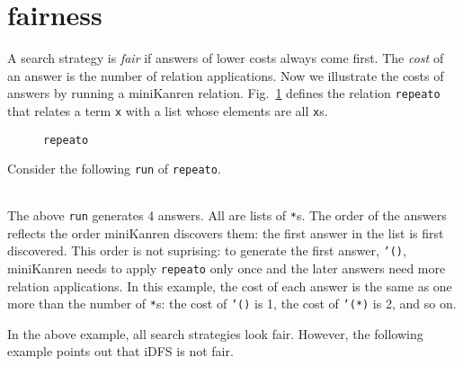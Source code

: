 \documentclass[format=acmlarge, review=true, authordraft=true]{acmart}
\begin{document}
\section{fairness}

A search strategy is \emph{fair} if answers of lower costs always come first. 
The \emph{cost} of an answer is the number of relation applications. Now we 
illustrate the costs of answers by running a miniKanren relation. 
Fig.~\ref{def-repeato} defines the relation \texttt{repeato} that relates a term 
\texttt{x} with a list whose elements are all \texttt{x}s.


\begin{figure}
  
  \caption{\texttt{repeato}}
  \label{def-repeato}
\end{figure}

Consider the following \texttt{run} of \texttt{repeato}.
\begin{center}
  \begin{tabular}{c}
  
   \end{tabular}
\end{center}

The above \texttt{run} generates 4 answers. All are lists of \texttt{*}s.
The order of the answers reflects the order miniKanren discovers them:
the first answer in the list is first discovered. This order is not suprising:
to generate the first answer, \texttt{'()}, miniKanren needs to apply
\texttt{repeato} only once and the later answers need more relation
applications. In this example, the cost of each answer is the same as
one more than the number of \texttt{*}s: the cost of \texttt{'()} is 1,
the cost of \texttt{'(*)} is 2, and so on.


In the above example, all search strategies look fair. However, the following 
example points out that iDFS is not fair.
\end{document}
